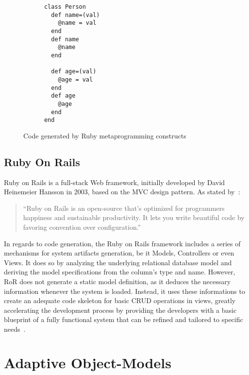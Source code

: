\begin{figure}[H]
  \centering
  \begin{minipage}{7cm}
    \begin{verbatim}
      class Person
        def name=(val)
          @name = val
        end
        def name
          @name
        end
        
        def age=(val)
          @age = val
        end
        def age
          @age
        end
      end
    \end{verbatim}
  \end{minipage}
  \caption{Code generated by Ruby metaprogramming constructs}
  \label{fig:ruby_class_metaprogramming_after}
\end{figure}

\subsection{Ruby On Rails}\label{sec:ror}

Ruby on Rails is a full-stack Web framework, initially developed by David Heinemeier Hansson in 2003, based on the MVC design pattern. As stated by~\cite{rubyonrails}:

\begin{quote}
  ``Ruby on Rails is an open-source that's optimized for programmers happiness and sustainable productivity. It lets you write beautiful code by favoring convention over configuration.''
\end{quote}

In regards to code generation, the Ruby on Rails framework includes a series of mechanisms for system artifacts generation, be it Models, Controllers or even Views. It does so by analyzing the underlying relational database model and deriving the model specifications from the column's type and name. However, RoR does not generate a static model definition, as it deduces the necessary information whenever the system is loaded. Instead, it uses these informations to create an adequate code skeleton for basic CRUD operations in views, greatly accelerating the development process by providing the developers with a basic blueprint of a fully functional system that can be refined and tailored to specific needs~\cite{rails_generators}.

\section{Adaptive Object-Models}\label{sec:aom}

